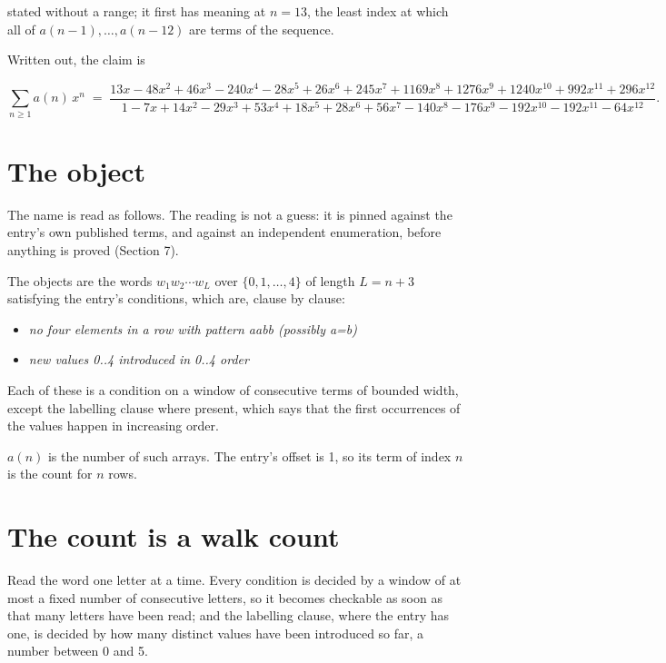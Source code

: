 \documentclass[11pt]{article}
\theoremstyle{definition}
\begin{document}
stated without a range; it first has meaning at $n = 13$, the least index at which all of $a(n-1),\dots,a(n-12)$ are terms of the sequence.

Written out, the claim is

\[\sum_{n \ge 1} a(n)\,x^n \;=\; \frac{13x - 48x^{2} + 46x^{3} - 240x^{4} - 28x^{5} + 26x^{6} + 245x^{7} + 1169x^{8} + 1276x^{9} + 1240x^{10} + 992x^{11} + 296x^{12}}{1 - 7x + 14x^{2} - 29x^{3} + 53x^{4} + 18x^{5} + 28x^{6} + 56x^{7} - 140x^{8} - 176x^{9} - 192x^{10} - 192x^{11} - 64x^{12}}.\]

\section{The object}

The name is read as follows. The reading is not a guess: it is pinned against the entry's own published terms, and against an independent enumeration, before anything is proved (Section 7).

The objects are the words $w_1 w_2 \cdots w_L$ over $\{0,1,\dots,4\}$ of length $L = n + 3$ satisfying the entry's conditions, which are, clause by clause:

\begin{itemize}

\item {\itshape no four elements in a row with pattern aabb (possibly a=b)}

\item {\itshape new values 0..4 introduced in 0..4 order}

\end{itemize}

Each of these is a condition on a window of consecutive terms of bounded width, except the labelling clause where present, which says that the first occurrences of the values happen in increasing order.

$a(n)$ is the number of such arrays. The entry's offset is 1, so its term of index $n$ is the count for $n$ rows.

\section{The count is a walk count}

Read the word one letter at a time. Every condition is decided by a window of at most a fixed number of consecutive letters, so it becomes checkable as soon as that many letters have been read; and the labelling clause, where the entry has one, is decided by how many distinct values have been introduced so far, a number between $0$ and 5.
\end{document}
